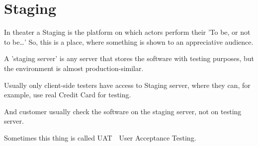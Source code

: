 \section{Staging}
\label{sec:Staging}

In theater a Staging is  the platform on which actors perform their 'To be, or not to be\ldots' So, this is a place, where something is shown to an appreciative audience. 

A 'staging server' is any server that stores the software with testing purposes, but the environment is almost production-similar. 

Usually only client-side testers have access to Staging server, where they can, for example, use real Credit Card for testing.

And customer usually check the software on the staging server, not on testing server.

Sometimes this thing is called UAT~\textemdash~User Acceptance Testing.
